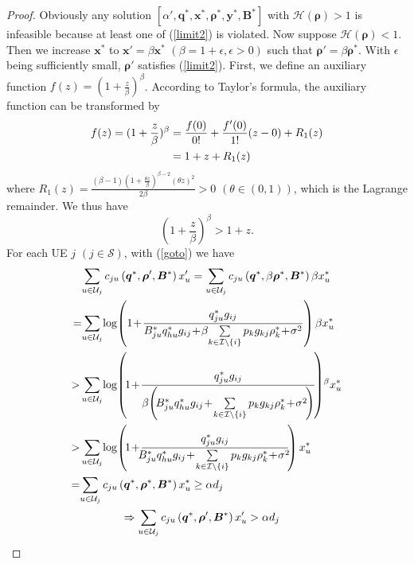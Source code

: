 \documentclass[10pt,journal,final,finalsubmission,twocolumn]{IEEEtran}
\begin{document}
\begin{proof}
Obviously any solution $[\alpha', \boldsymbol{q}^*,\boldsymbol{x}^*,\boldsymbol{\rho}^*, \boldsymbol{y}^*,\boldsymbol{B}^*]$ with $\mathcal{H}(\boldsymbol{\rho}) > 1$ is infeasible because at least one of (\ref{limit2}) is violated. Now suppose $\mathcal{H}(\boldsymbol{\rho}) < 1$. Then we increase $\boldsymbol{x}^*$ to $\boldsymbol{x}' =\beta\boldsymbol{x}^*$ $(\beta = 1 + \epsilon, \epsilon > 0)$ such that $\boldsymbol{\rho}' =\beta\boldsymbol{\rho}^*$. With $\epsilon$ being sufficiently small, $\boldsymbol{\rho}'   $ satisfies (\ref{limit2}). First, we define an auxiliary function $f(z) = (1+\frac{z}{\beta})^\beta$. According to Taylor's formula, the auxiliary function can be transformed by
\begin{align}
f(z) =(1+\frac{z}{\beta})^\beta&= \frac{f(0)}{0!} + \frac{f'(0)}{1!}(z-0)+R_1(z)\notag\\
&=1+z+R_1(z)
\end{align}
where $R_1(z)=\frac {(\beta-1)(1+\frac{\theta z}{\beta})^{\beta-2}(\theta z)^2}{2\beta}>0$ $(\theta \in (0,1))$, which is the Lagrange remainder. We thus have
\begin{equation}\label{goto}
(1+\frac{z}{\beta})^\beta>1+z.
\end{equation}
For each UE $j$ $(j\in \mathcal{S})$, with (\ref{goto}) we have
\begin{align}
&\sum\limits_{u\in \mathcal{U}_j} c_{ju}\left (\boldsymbol{q}^*,\boldsymbol{ \rho}', \boldsymbol{B}^*\right ) x_u'=\sum\limits_{u\in \mathcal{U}_j} c_{ju}\left (\boldsymbol{q}^*,\beta\boldsymbol{ \rho}^*, \boldsymbol{B}^*\right ) \beta x_u^*\notag\\
\!=\!&\sum\limits_{u\in \mathcal{U}_j}\!\log \!\left ( 1\!+\!\frac{q_{ju}^*g_{ij}}{{B_{ju}^*q_{hu}^*g_{ij}}\!+\!\beta{\sum\limits_{k\in \mathcal{I}\setminus \left \{ i \right \}}p_kg_{kj}\rho_k^*}\!+\!\sigma ^2} \right )\beta x_u^*\notag\\
>& \sum\limits_{u\in \mathcal{U}_j}\!\log \!\left ( \!1\!+\!\frac{q_{ju}^*g_{ij}}{\beta\!\left(\!{B_{ju}^*q_{hu}^*g_{ij}}\!+\!{\sum\limits_{k\in \mathcal{I}\setminus \left \{ i \right \}}p_kg_{kj}\rho_k^*}\!+\!\sigma ^2\!\right)} \!\right )\!^\beta x_u^*\label{lemma1-1}\notag\\
>&\sum\limits_{u\in \mathcal{U}_j}\!\log \!\left ( \!1\!+\!\frac{q_{ju}^*g_{ij}}{\!\!{B_{ju}^*q_{hu}^*g_{ij}}\!+\!{\sum\limits_{k\in \mathcal{I}\setminus \left \{ i \right \}}p_kg_{kj}\rho_k^*}\!+\!\sigma ^2\!} \!\right ) x_u^*\notag\\
=&\!\sum\limits_{u\in \mathcal{U}_j} c_{ju}\left (\boldsymbol{q}^*,\boldsymbol{ \rho}^*, \boldsymbol{B}^*\right )  x_u^*\geq\alpha d_j\notag\\
\ &\ \ \ \ \ \ \ \ \ \ \ \Rightarrow \sum\limits_{u\in \mathcal{U}_j} c_{ju}\left (\boldsymbol{q}^*,\boldsymbol{ \rho}', \boldsymbol{B}^*\right ) x_u'>\alpha d_j
\end{align}


\end{proof}
\end{document}
